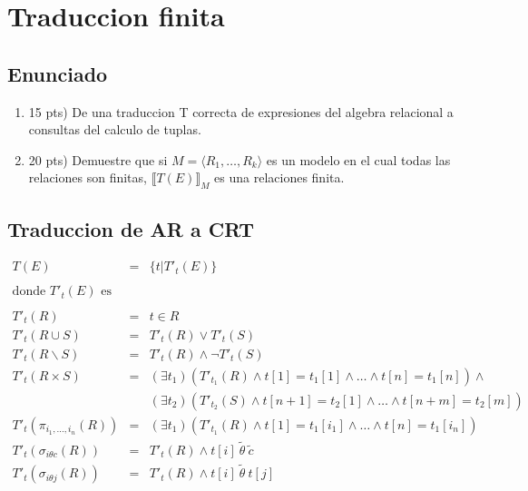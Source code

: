 \documentclass[a4paper]{article}
\begin{document}
	\section{Traduccion finita}
	\subsection{Enunciado}
	\begin{enumerate}
		\item 15 pts) De una traduccion T correcta de expresiones del algebra relacional a consultas del calculo de tuplas.
		\item 20 pts) Demuestre que si $ M =\langle R_1,\ldots,R_k \rangle $ es un modelo en el cual todas las relaciones son finitas, $ \llbracket T(E)\rrbracket _M $ es una relaciones finita.
	\end{enumerate}
	\subsection{Traduccion de AR a CRT}
	\begin{eqnarray*}
		T(E) & = & \{ t|T'_t(E) \} \\
		\\
		\mbox{donde }T'_t(E)\mbox{ es}\\
		\\
		T'_t(R) & = & t \in R \\
		T'_t(R \cup S) & = & T'_t(R) \vee T'_t(S) \\
		T'_t(R \backslash S) & = & T'_t(R) \wedge \neg T'_t(S) \\
		T'_t(R \times S) & = & 
			(\exists t_1)(T'_{t_1}(R) \wedge t[1]=t_1[1] \wedge \ldots \wedge t[n]=t_1[n]) \wedge \\ && 
			(\exists t_2)(T'_{t_2}(S) \wedge t[n+1]=t_2[1] \wedge \ldots \wedge t[n+m]=t_2[m]) \\
		T'_t(\pi_{i_1, \ldots, i_n}(R)) & = & 
			(\exists t_1)(T'_{t_1}(R) \wedge t[1]=t_1[i_1] \wedge \ldots \wedge t[n]=t_1[i_n]) \\
		T'_t(\sigma _{i \theta c}(R)) & = & T'_t(R) \wedge t[i] \ \widetilde{\theta} \ \widetilde{c} \\
		T'_t(\sigma _{i \theta j}(R)) & = & T'_t(R) \wedge t[i] \ \widetilde{\theta} \ t[j]
	\end{eqnarray*}
\end{document}
